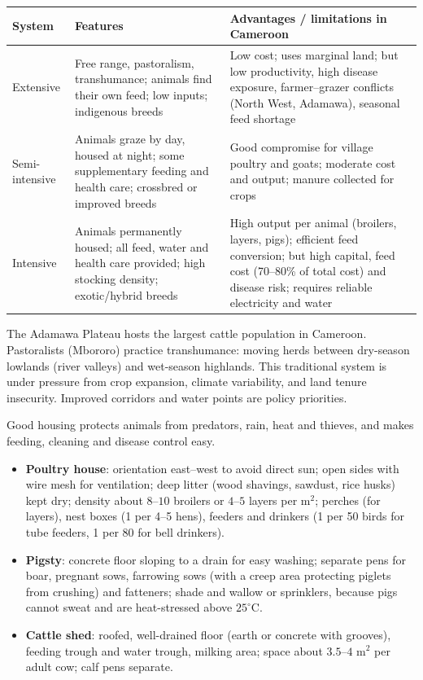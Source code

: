 \documentclass[11pt]{article}
\newcommand{\cle}[1]{{\popxbold\color{popdark}#1}}
\newcounter{popsec}
\newcounter{popsub}
\newcommand{\courssub}[1]{%
  \stepcounter{popsub}%
  \par\vspace{9pt}\noindent{\popxbold\fontsize{11.5}{13}\selectfont\color{popink}{\color{poporange}\thepopsec.\thepopsub}\hspace{6pt}#1}\par\nopagebreak\vspace{4pt}
}
\begin{document}
\begin{center}
\begin{tabularx}{\linewidth}{|l|X|X|}
\hline
\rowcolor{popblueL} \textbf{System} & \textbf{Features} & \textbf{Advantages / limitations in Cameroon} \\
\hline
Extensive & Free range, pastoralism, transhumance; animals find their own feed; low inputs; indigenous breeds & Low cost; uses marginal land; but low productivity, high disease exposure, farmer--grazer conflicts (North West, Adamawa), seasonal feed shortage \\
\hline
Semi-intensive & Animals graze by day, housed at night; some supplementary feeding and health care; crossbred or improved breeds & Good compromise for village poultry and goats; moderate cost and output; manure collected for crops \\
\hline
Intensive & Animals permanently housed; all feed, water and health care provided; high stocking density; exotic/hybrid breeds & High output per animal (broilers, layers, pigs); efficient feed conversion; but high capital, feed cost (70--80\% of total cost) and disease risk; requires reliable electricity and water \\
\hline
\end{tabularx}
\end{center}

\begin{savaistu}
The Adamawa Plateau hosts the largest cattle population in Cameroon. Pastoralists (Mbororo) practice transhumance: moving herds between dry-season lowlands (river valleys) and wet-season highlands. This traditional system is under pressure from crop expansion, climate variability, and land tenure insecurity. Improved corridors and water points are policy priorities.
\end{savaistu}

\courssub{Housing and Equipment}

Good housing protects animals from predators, rain, heat and thieves, and makes feeding, cleaning and disease control easy.

\begin{itemize}
\item \textbf{Poultry house}: orientation east--west to avoid direct sun; open sides with wire mesh for \cle{ventilation}; deep litter (wood shavings, sawdust, rice husks) kept dry; density about $8$--$10$ broilers or $4$--$5$ layers per m$^2$; perches (for layers), nest boxes (1 per 4--5 hens), feeders and drinkers (1 per 50 birds for tube feeders, 1 per 80 for bell drinkers).
\item \textbf{Pigsty}: concrete floor sloping to a drain for easy washing; separate pens for boar, pregnant sows, farrowing sows (with a creep area protecting piglets from crushing) and fatteners; shade and wallow or sprinklers, because pigs cannot sweat and are heat-stressed above $25^\circ$C.
\item \textbf{Cattle shed}: roofed, well-drained floor (earth or concrete with grooves), feeding trough and water trough, milking area; space about $3.5$--$4$ m$^2$ per adult cow; calf pens separate.
\end{itemize}
\end{document}
